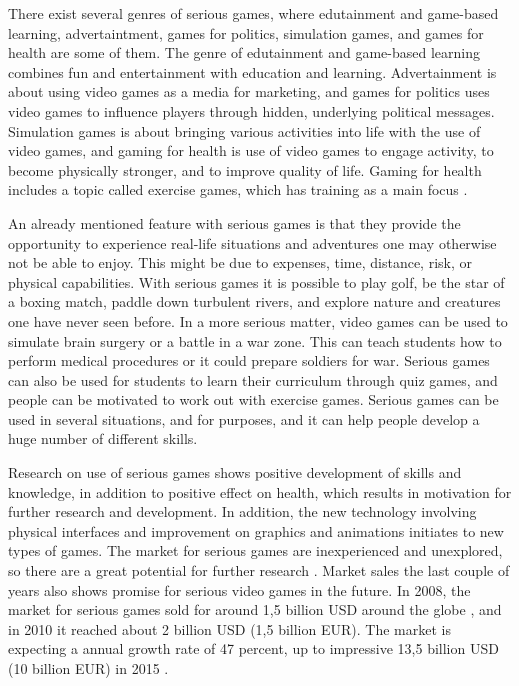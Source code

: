 There exist several genres of serious games, where edutainment and game-based learning, advertaintment, games for politics, simulation games, and games for health are some of them. The genre of edutainment and game-based learning combines fun and entertainment with education and learning. Advertainment is about using video games as a media for marketing, and games for politics uses video games to influence players through hidden, underlying political messages. Simulation games is about bringing various activities into life with the use of video games, and gaming for health is use of video games to engage activity, to become physically stronger, and to improve quality of life. Gaming for health includes a topic called exercise games, which has training as a main focus \cite{understandingvg} \cite{alfingewang}.

An already mentioned feature with serious games is that they provide the opportunity to experience real-life situations and adventures one may otherwise not be able to enjoy. This might be due to expenses, time, distance, risk, or physical capabilities. With serious games it is possible to play golf, be the star of a boxing match, paddle down turbulent rivers, and explore nature and creatures one have never seen before. In a more serious matter, video games can be used to simulate brain surgery or a battle in a war zone. This can teach students how to perform medical procedures or it could prepare soldiers for war. Serious games can also be used for students to learn their curriculum through quiz games, and people can be motivated to work out with exercise games. Serious games can be used in several situations, and for purposes, and it can help people develop a huge number of different skills. 

Research on use of serious games shows positive development of skills and knowledge, in addition to positive effect on health, which results in motivation for further research and development. In addition, the new technology involving physical interfaces and improvement on graphics and animations initiates to new types of games. The market for serious games are inexperienced and unexplored, so there are a great potential for further research \cite{alfingewang}. Market sales the last couple of years also shows promise for serious video games in the future. In 2008, the market for serious games sold for around 1,5 billion USD around the globe \cite{alfingewang}, and in 2010 it reached about 2 billion USD (1,5 billion EUR). The market is expecting a annual growth rate of 47 percent, up to impressive 13,5 billion USD (10 billion EUR) in 2015 \cite{idate}. 


